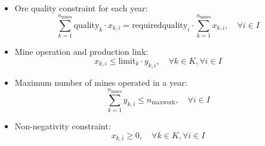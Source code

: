 \documentclass{article}
\begin{document}
\begin{itemize}
    \item Ore quality constraint for each year:
    \[
    \sum_{k=1}^{n_{\text{mines}}} \text{quality}_{k} \cdot x_{k,i} = \text{requiredquality}_{i} \cdot \sum_{k=1}^{n_{\text{mines}}} x_{k,i}, \quad \forall i \in I
    \]

    \item Mine operation and production link:
    \[
    x_{k,i} \leq \text{limit}_{k} \cdot y_{k,i}, \quad \forall k \in K, \forall i \in I
    \]

    \item Maximum number of mines operated in a year:
    \[
    \sum_{k=1}^{n_{\text{mines}}} y_{k,i} \leq n_{\text{maxwork}}, \quad \forall i \in I
    \]

    \item Non-negativity constraint:
    \[
    x_{k,i} \geq 0, \quad \forall k \in K, \forall i \in I
    \]
\end{itemize}
\end{document}
